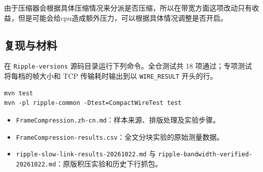 \documentclass[UTF8,a4paper,11pt,fontset=fandol]{ctexart}
\newcommand{\code}[1]{\nolinkurl{#1}}
\begin{document}
由于压缩器会根据具体压缩情况来分派是否压缩，所以在带宽方面这项改动只有收益，但是可能会给cpu造成额外压力，可以根据具体情况调整是否开启。

\subsection{复现与材料}
在 \code{Ripple-versions} 源码目录运行下列命令。全仓测试共 18 项通过；专项测试将每档的帧大小和 TCP 传输耗时输出到以 \code{WIRE\_RESULT} 开头的行。
\begin{verbatim}
mvn test
mvn -pl ripple-common -Dtest=CompactWireTest test
\end{verbatim}
\begin{itemize}
\item \code{FrameCompression.zh-cn.md}：样本来源、排版处理及实验步骤。
\item \code{FrameCompression-results.csv}：全文分块实验的原始测量数据。
\item \code{ripple-slow-link-results-20261022.md} 与 \code{ripple-bandwidth-verified-20261022.md}：原版积压实验和历史下行抓包。
\end{itemize}
\end{document}
